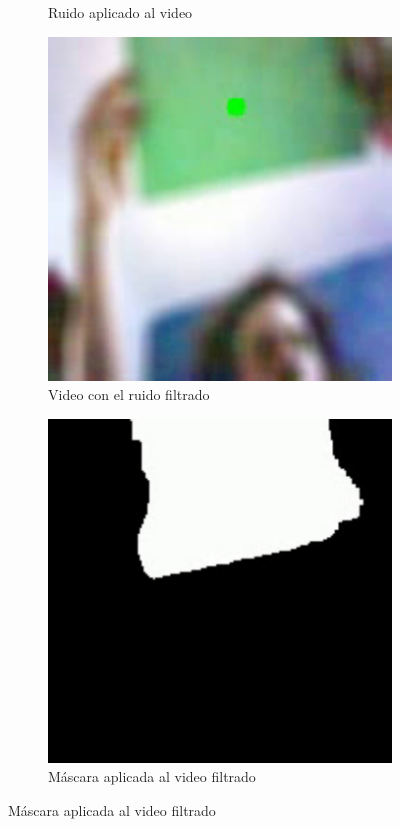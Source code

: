\documentclass[12pt, oneside]{article}
\begin{document}
{\begin{figure}[h!]
\begin{subfigure}[tr]{0.35\textwidth}
            \caption{\sffamily Ruido aplicado al video}
        \end{subfigure}
        \begin{subfigure}[bl]{0.35\textwidth}
            \centering
            \includegraphics[width=\linewidth]{filter.jpg}
            \caption{\sffamily Video con el ruido filtrado}
        \end{subfigure}
        \begin{subfigure}[br]{0.35\textwidth}
            \centering
            \includegraphics[width=\linewidth]{mask.jpg}
            \caption{\sffamily Máscara aplicada al video filtrado}
        \end{subfigure}


\end{figure}}
\end{document}
